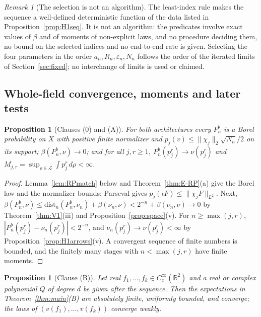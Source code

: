 \documentclass[11pt]{article}
\theoremstyle{plain}
\newtheorem{proposition}[theorem]{Proposition}
\theoremstyle{definition}
\theoremstyle{remark}
\newtheorem{remark}[theorem]{Remark}
\newcommand{\R}{\mathbb{R}}
\newcommand{\cL}{\mathcal{L}}
\newcommand{\dist}{\mathrm{dist}}
\begin{document}
\begin{remark}[The selection is not an algorithm]\label{rem:nonalgorithmic}
The least-index rule makes the sequence a well-defined deterministic function
of the data listed in Proposition~\ref{prop:H1seq}. It is not an algorithm: the
predicates involve exact values of $\beta$ and of moments of non-explicit laws,
and no procedure deciding them, no bound on the selected indices and no
end-to-end rate is given. Selecting the four parameters in the order $a_n,R_n,\varepsilon_n,N_n$ follows
the order of the iterated limits of Section~\ref{sec:fixed}; no interchange of
limits is used or claimed.
\end{remark}

\subsection{Whole-field convergence, moments and later tests}

\begin{proposition}[Clauses (0) and (A)]\label{prop:H1conv}
For both architectures every $P^{b}_{n}$ is a Borel probability on $X$ with
positive finite normalizer and $p_j(v)\le\|\chi_j\|_2\sqrt{N_n}/2$ on its support;
$\beta(P^{b}_{n},\nu)\to0$; and for all $j,r\ge1$, $P^{b}_{n}(p_j^{r})\to\nu(p_j^{r})$ and
$M_{j,r}=\sup_{\rho\in\cL}\int p_j^{r}\,d\rho<\infty$.
\end{proposition}

\begin{proof}
Lemma~\ref{lem:RPmatch} below and Theorem~\ref{thm:E-RP}(a) give the Borel law and
the normalizer bounds; Parseval gives $p_j(\iota F)\le\|\chi_jF\|_{L^{2}}$. Next,
$\beta(P^{b}_{n},\nu)\le\dist_n(P^{b}_{n},\nu_n)+\beta(\nu_n,\nu)<2^{-n}+\beta(\nu_n,\nu)\to0$ by
Theorem~\ref{thm:V1}(iii) and Proposition~\ref{prop:space}(v). For $n\ge\max(j,r)$,
$|P^{b}_{n}(p_j^{r})-\nu_n(p_j^{r})|<2^{-n}$, and $\nu_n(p_j^{r})\to\nu(p_j^{r})<\infty$ by
Proposition~\ref{prop:H1arrows}(v). A convergent sequence of finite numbers is
bounded, and the finitely many stages with $n<\max(j,r)$ have finite moments.
\end{proof}

\begin{proposition}[Clause (B)]\label{prop:H1later}
Let real $f_1,\dots,f_k\in C_c^{\infty}(\R^{2})$ and a real or complex polynomial $Q$ of
degree $d$ be given after the sequence. Then the expectations in
Theorem~\ref{thm:main}(B) are absolutely finite, uniformly bounded, and converge;
the laws of $(v(f_1),\dots,v(f_k))$ converge weakly.
\end{proposition}
\end{document}
